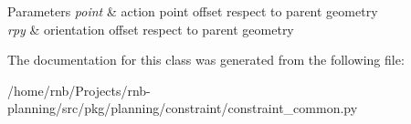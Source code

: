 \begin{DoxyParams}{Parameters}
{\em point} & action point offset respect to parent geometry \\
\hline
{\em rpy} & orientation offset respect to parent geometry \\
\hline
\end{DoxyParams}


The documentation for this class was generated from the following file\+:\begin{DoxyCompactItemize}
\item 
/home/rnb/\+Projects/rnb-\/planning/src/pkg/planning/constraint/constraint\+\_\+common.\+py\end{DoxyCompactItemize}

